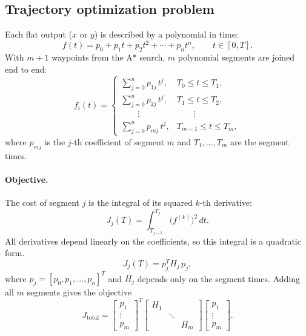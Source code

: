 \subsection{Trajectory optimization problem}
\label{sec:qp}
Each flat output ($x$ or $y$) is described by a polynomial in time:
\begin{equation}
f(t) = p_0 + p_1 t + p_2 t^2 + \cdots + p_n t^n, \qquad t\in[0,T].
\label{eq:poly}
\end{equation}
With $m+1$ waypoints from the A* search, $m$ polynomial segments are joined end to end:
\begin{equation}
f_i(t) =
\begin{cases}
\sum\limits_{j=0}^{n} p_{1j}\, t^{j}, & T_0 \le t \le T_1,\\[4pt]
\sum\limits_{j=0}^{n} p_{2j}\, t^{j}, & T_1 \le t \le T_2,\\[2pt]
\qquad\vdots & \qquad\vdots\\[2pt]
\sum\limits_{j=0}^{n} p_{mj}\, t^{j}, & T_{m-1} \le t \le T_m,
\end{cases}
\label{eq:piecewise}
\end{equation}
where $p_{mj}$ is the $j$-th coefficient of segment $m$ and $T_1,\dots,T_m$ are the segment times.

\paragraph{Objective.}
The cost of segment $j$ is the integral of its squared $k$-th derivative:
\begin{equation}
J_j(T) = \int_{T_{j-1}}^{T_j} \big(f^{(k)}\big)^2\, dt.
\label{eq:segint}
\end{equation}
All derivatives depend linearly on the coefficients, so this integral is a quadratic form.
\begin{equation}
J_j(T) = p_j^T H_j\, p_j,
\label{eq:quad}
\end{equation}
where $p_j = [p_0, p_1, \dots, p_n]^T$ and $H_j$ depends only on the segment times. Adding all $m$ segments gives the objective
\begin{equation}
J_{\text{total}} =
\begin{bmatrix} p_1\\ \vdots\\ p_m \end{bmatrix}^T
\begin{bmatrix} H_1 & & \\ & \ddots & \\ & & H_m \end{bmatrix}
\begin{bmatrix} p_1\\ \vdots\\ p_m \end{bmatrix}.
\label{eq:objective}
\end{equation}

